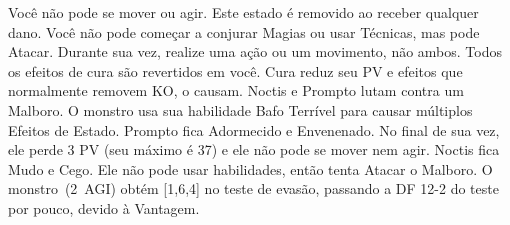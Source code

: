 %
 Você não pode se mover ou agir. Este estado é removido ao receber qualquer dano.\ofgap
%
 Você não pode começar a conjurar Magias ou usar Técnicas, mas pode Atacar.\ofgap
%
 Durante sua vez, realize uma ação ou um movimento, não ambos.\ofgap
%
 Todos os efeitos de cura são revertidos em você. Cura reduz seu PV e efeitos que normalmente removem KO, o causam.
%
\vfill
%
{
	Noctis e Prompto lutam contra um Malboro. 
	O monstro usa sua habilidade Bafo Terrível para causar múltiplos Efeitos de Estado. 
	Prompto fica Adormecido e Envenenado. 
	No final de sua vez, ele perde 3 PV (seu máximo é 37) e ele não pode se mover nem agir. 
	Noctis fica Mudo e Cego. 
	Ele não pode usar habilidades, então tenta Atacar o Malboro. 
	O monstro~(2~AGI) obtém [1,6,4] no teste de evasão, passando a DF 12-2 do teste por pouco, devido à Vantagem.
}
%
\clearpage
